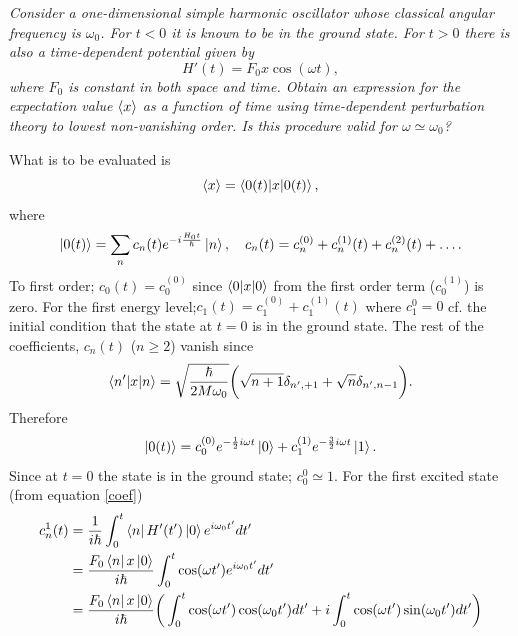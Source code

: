 \begin{example}
	\emph{Consider a one-dimensional simple harmonic oscillator whose classical angular frequency is $\omega_0$. For $t<0$ it is known to be in the ground state. For $t>0$ there is also a time-dependent potential given by}
	\begin{equation}
		H'(t)=F_0x\cos(\omega t),
	\end{equation} 	
	\emph{where $F_0$ is constant in both space and time. Obtain an expression for the expectation value $\braket{x}$ as a function of time using time-dependent perturbation theory to lowest non-vanishing order. Is this procedure valid for $\omega\simeq \omega_0$?}\newline
	
	What is to be evaluated is
	\begin{equation}
		\braket{x}=\braket{0(t)|x|0(t)},
	\end{equation} 
	where
	\begin{equation}
		\ket{0(t)}=\sum_{n}c_n(t)e^{-i\frac{H_0t}{\hbar}}\ket{n}, \quad c_n(t)=c_n^{(0)}+c_n^{(1)}(t)+c_n^{(2)}(t)+\dots.
	\end{equation} 
	To first order; $c_0(t)=c_0^{(0)}$ since $\braket{0|x|0}$ from the first order term ($c_0^{(1)}$) is zero. For the first energy level;$c_1(t)=c_1^{(0)}+c_1^{(1)}(t)$ where $c_1^{0}=0$ cf. the initial condition that the state at $t=0$ is in the ground state. The rest of the coefficients, $c_n(t)$ ($n\geq2$) vanish since
	\begin{equation}
		\braket{n'|x|n}=\sqrt{\frac{\hbar}{2M\omega_0}}\bigg(\sqrt{n+1}\delta_{n',+1}+\sqrt{n}\delta_{n',n-1}\bigg).
		\label{hest}
	\end{equation} 
	Therefore
	\begin{equation}
		\ket{0(t)}=c_0^{(0)}e^{-\frac{1}{2}i\omega t}\ket{0}+c_1^{(1)}e^{-\frac{3}{2}i\omega t}\ket{1}.
	\end{equation} 
	Since at $t=0$ the state is in the ground state; $c_0^{0}\simeq1$. For the first excited state (from equation \eqref{coef})
	\begin{equation}
		\begin{split}
			c^1_{n}(t)&=\frac{1}{i\hbar}\int_{0}^{t}\bra{n}H'(t')\ket{0}e^{i\omega_{0}t'}dt'\\
			&=\frac{F_0\bra{n}x\ket{0}}{i\hbar}\int_{0}^{t}\cos(\omega t')e^{i\omega_{0}t'}dt'\\
			&=\frac{F_0\bra{n}x\ket{0}}{i\hbar}\bigg(\int_{0}^{t}\cos(\omega t')\cos(\omega_0t')dt'+i\int_{0}^{t}\cos(\omega t')\sin(\omega_0t')dt'\bigg)\\

\end{split}
\end{equation}
\end{example}
